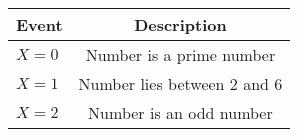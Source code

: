 \begin{tabular}{|l|c|}

\hline
\textbf{Event} & \textbf{Description} \\
\hline
$X = 0$ &  Number is a prime number \\
\hline
$X = 1$ &  Number lies between 2 and 6  \\
\hline
$X = 2$ &  Number is an odd number \\
\hline
\end{tabular}